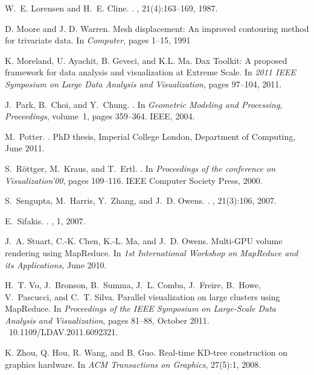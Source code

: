 \documentclass[10pt,journal,cspaper,compsoc]{IEEEtran}
\begin{document}
\begin{thebibliography}{10}
W.~E. Lorensen and H.~E. Cline.
.
, 21(4):163--169, 1987.

D. Moore and J. D. Warren.
\newblock Mesh displacement: An improved contouring method for trivariate data.
\newblock In {\em Computer}, pages 1--15, 1991

K. Moreland, U. Ayachit, B. Geveci, and K.L. Ma.
\newblock Dax Toolkit: A proposed framework for data analysis and visualization at Extreme Scale.
\newblock In {\em 2011 IEEE Symposium on Large Data Analysis and Visualization}, pages 97--104, 2011.

J.~Park, B.~Choi, and Y.~Chung.
.
\newblock In {\em Geometric Modeling and Processing, Proceedings}, volume~1,
  pages 359--364. IEEE, 2004.

M.~Potter.
.
\newblock PhD thesis, Imperial College London, Department of Computing, June
  2011.

S.~R\"{o}ttger, M.~Kraus, and T.~Ertl.
.
\newblock In {\em Proceedings of the conference on Visualization'00}, pages
  109--116. IEEE Computer Society Press, 2000.

S.~Sengupta, M.~Harris, Y.~Zhang, and J.~D. Owens.
.
, 21(3):106, 2007.

E.~Sifakis.
.
, 1, 2007.

J.~A. Stuart, C.-K. Chen, K.-L. Ma, and J.~D. Owens.
\newblock Multi-{GPU} volume rendering using {MapReduce}.
\newblock In {\em 1st International Workshop on MapReduce and its
  Applications}, June 2010.

H.~T. Vo, J.~Bronson, B.~Summa, J.~L. Comba, J.~Freire, B.~Howe, V.~Pascucci,
  and C.~T. Silva.
\newblock Parallel visualization on large clusters using {MapReduce}.
\newblock In {\em Proceedings of the IEEE Symposium on Large-Scale Data
  Analysis and Visualization}, pages 81--88, October 2011.
~10.1109/LDAV.2011.6092321.

K. Zhou, Q. Hou, R. Wang, and B. Guo.
\newblock Real-time KD-tree construction on graphics hardware.
\newblock In {\em ACM Transactions on Graphics}, 27(5):1, 2008.

\end{thebibliography}
\end{document}
